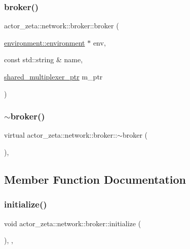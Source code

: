 \subsubsection{\texorpdfstring{broker()}{broker()}}
{\footnotesize\ttfamily actor\+\_\+zeta\+::network\+::broker\+::broker (\begin{DoxyParamCaption}\item[{\hyperlink{classactor__zeta_1_1environment_1_1environment}{environment\+::environment} $\ast$}]{env,  }\item[{const std\+::string \&}]{name,  }\item[{\hyperlink{namespaceactor__zeta_1_1network_a504802c43f97832081066e4c7aeb5f24}{shared\+\_\+multiplexer\+\_\+ptr}}]{m\+\_\+ptr }\end{DoxyParamCaption})}

\mbox{\label{classactor__zeta_1_1network_1_1broker_aaf24d2099f0c5cbee7d12bc77144f6b3}} 
\subsubsection{\texorpdfstring{$\sim$broker()}{~broker()}}
{\footnotesize\ttfamily virtual actor\+\_\+zeta\+::network\+::broker\+::$\sim$broker (\begin{DoxyParamCaption}{ }\end{DoxyParamCaption})\hspace{0.3cm}{\ttfamily [virtual]}, {\ttfamily [default]}}



\subsection{Member Function Documentation}
\mbox{\label{classactor__zeta_1_1network_1_1broker_a5e63848370208ff7e670ec08ea7b3cf9}} 
\subsubsection{\texorpdfstring{initialize()}{initialize()}}
{\footnotesize\ttfamily void actor\+\_\+zeta\+::network\+::broker\+::initialize (\begin{DoxyParamCaption}{ }\end{DoxyParamCaption})\hspace{0.3cm}{\ttfamily [override]}, {\ttfamily [protected]}, {\ttfamily [virtual]}}



